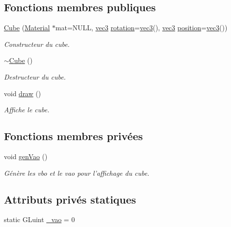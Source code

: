 \subsection*{Fonctions membres publiques}
\begin{DoxyCompactItemize}
\item 
\hyperlink{class_cube_a6d016e01f3fee45cff97be27ff7175d8}{Cube} (\hyperlink{class_material}{Material} $\ast$mat=N\+U\+L\+L, \hyperlink{structvec3}{vec3} \hyperlink{class_objet_ac69a1b459bcb4433099c8cfbff06b209}{rotation}=\hyperlink{structvec3}{vec3}(), \hyperlink{structvec3}{vec3} \hyperlink{class_objet_a0e109bc790b14328202dd2546b04e2fd}{position}=\hyperlink{structvec3}{vec3}())
\begin{DoxyCompactList}\small\item\em Constructeur du cube. \end{DoxyCompactList}\item 
\hyperlink{class_cube_aa814e979cecb8c451fdb332ded2cea1e}{$\sim$\+Cube} ()
\begin{DoxyCompactList}\small\item\em Destructeur du cube. \end{DoxyCompactList}\item 
void \hyperlink{class_cube_ab26b72a81376fd5dc4fcc7f0b715b087}{draw} ()
\begin{DoxyCompactList}\small\item\em Affiche le cube. \end{DoxyCompactList}\end{DoxyCompactItemize}
\subsection*{Fonctions membres privées}
\begin{DoxyCompactItemize}
\item 
void \hyperlink{class_cube_a06f4c8632c223f8d8c34971e55a2dafc}{gen\+Vao} ()
\begin{DoxyCompactList}\small\item\em Génère les vbo et le vao pour l'affichage du cube. \end{DoxyCompactList}\end{DoxyCompactItemize}
\subsection*{Attributs privés statiques}
\begin{DoxyCompactItemize}
\item 
static G\+Luint \hyperlink{class_cube_ae474ca8293842dd9ac83a8c606991eac}{\+\_\+vao} = 0
\end{DoxyCompactItemize}
